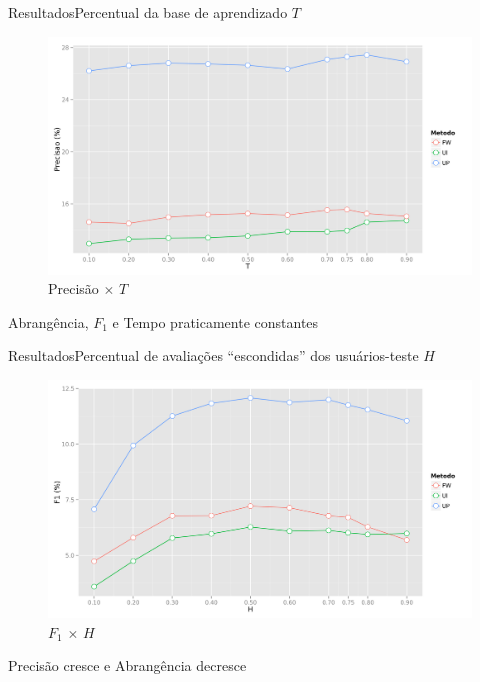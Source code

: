 \begin{frame}{Resultados}{Percentual da base de aprendizado $T$}
\begin{figure}[ht]
    \begin{center}
    \includegraphics[width=.8\textwidth]{../img/precision_T}
    \end{center}
    \caption{Precisão $\times$ $T$}
    \label{fig:precision_T}
\end{figure}
\begin{center}
    Abrangência, $F_1$ e Tempo praticamente constantes
\end{center}
\end{frame}

\begin{frame}{Resultados}{Percentual de avaliações ``escondidas'' dos usuários-teste $H$}
\begin{figure}[ht]
    \begin{center}
    \includegraphics[width=.8\textwidth]{../img/F1_H}
    \end{center}
    \caption{$F_1$ $\times$ $H$}
    \label{fig:F1_H}
\end{figure}
\begin{center}
    Precisão cresce e Abrangência decresce
\end{center}
\end{frame}


